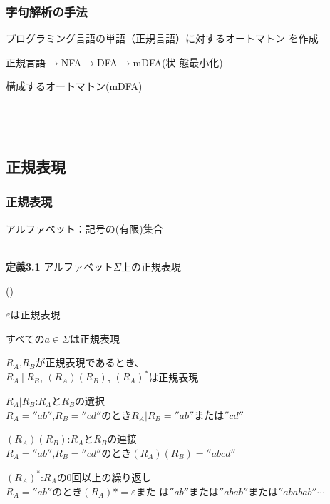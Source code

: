 \documentclass[dvipdfmx]{beamer}
\newcounter{coffee}
\begin{document}
\begin{frame}
 \frametitle{字句解析の手法}
 プログラミング言語の単語（正規言語）に対するオートマトン
 を作成 

 正規言語$\rightarrow$NFA$\rightarrow$DFA$\rightarrow$mDFA(状
 態最小化)

\begin{list}{}{}
 \item 構成するオートマトン(mDFA)\\
       \\
       \\[10pt]
       \\[10pt]
\end{list}
\end{frame}

\subsection{正規表現}

\begin{frame}
 \frametitle{正規表現}
 アルファベット：記号の(有限)集合\\
 \\
 \begin{screen}
  {\bf 定義3.1} アルファベット$\Sigma$上の正規表現
	\begin{list}{()}{}
	 \item $\varepsilon$は正規表現
	 \item すべての$a\in\Sigma$は正規表現
	 \item $R_A$,$R_B$が正規表現であるとき、\\
	       \qquad $R_A\ |\ R_B$,
	       $(R_A)(R_B)$, $(R_A)^\ast$は正規表現
	\end{list}
 \end{screen}
 {\scriptsize	
 \begin{list}{}{}
  \item $R_A|R_B$:$R_A$と$R_B$の選択\\
	$R_A=''ab''$,$R_B=''cd''$のとき$R_A|R_B=''ab''\mbox{または}''cd''$
  \item $(R_A)(R_B)$:$R_A$と$R_B$の連接\\
	$R_A=''ab''$,$R_B=''cd''$のとき$(R_A)(R_B)=''abcd''$
  \item $(R_A)^\ast$:$R_A$の0回以上の繰り返し\\
	$R_A=''ab''$のとき$(R_A)\ast=\varepsilon\mbox{また
	は}''ab''\mbox{または}''abab''\mbox{または}''ababab''\cdots$
 \end{list}
 }
\end{frame}
\end{document}
